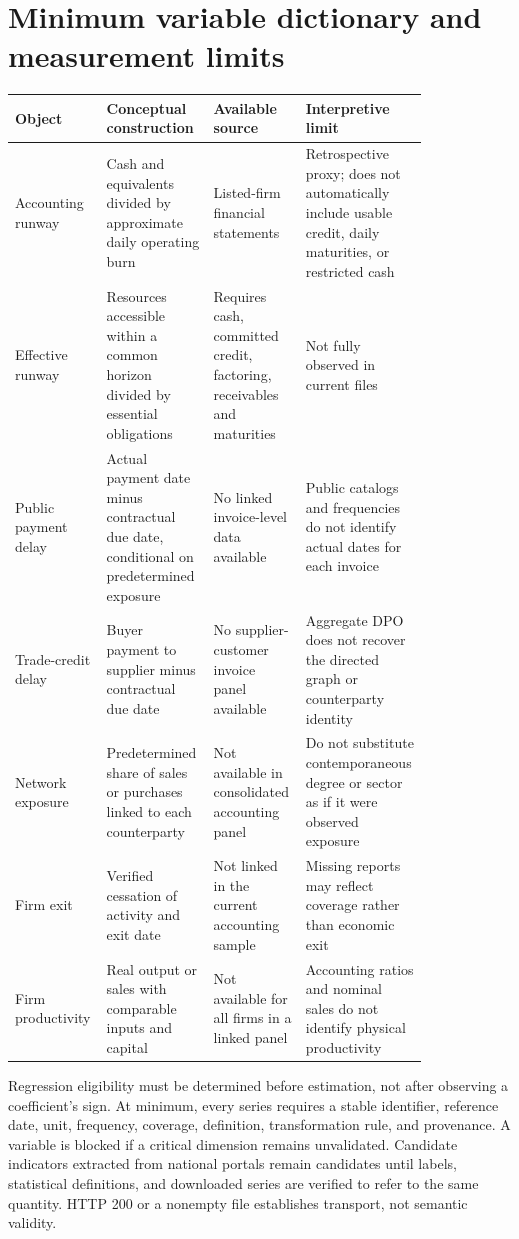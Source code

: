 \documentclass[11pt,a4paper]{article}
\begin{document}
\section{Minimum variable dictionary and measurement limits}
\begin{longtable}{>{\raggedright\arraybackslash}p{0.16\linewidth}>{\raggedright\arraybackslash}p{0.25\linewidth}>{\raggedright\arraybackslash}p{0.21\linewidth}>{\raggedright\arraybackslash}p{0.20\linewidth}}
\toprule
Object & Conceptual construction & Available source & Interpretive limit\\
\midrule
\endhead
Accounting runway & Cash and equivalents divided by approximate daily operating burn & Listed-firm financial statements & Retrospective proxy; does not automatically include usable credit, daily maturities, or restricted cash\\
Effective runway & Resources accessible within a common horizon divided by essential obligations & Requires cash, committed credit, factoring, receivables and maturities & Not fully observed in current files\\
Public payment delay & Actual payment date minus contractual due date, conditional on predetermined exposure & No linked invoice-level data available & Public catalogs and frequencies do not identify actual dates for each invoice\\
Trade-credit delay & Buyer payment to supplier minus contractual due date & No supplier-customer invoice panel available & Aggregate DPO does not recover the directed graph or counterparty identity\\
Network exposure & Predetermined share of sales or purchases linked to each counterparty & Not available in consolidated accounting panel & Do not substitute contemporaneous degree or sector as if it were observed exposure\\
Firm exit & Verified cessation of activity and exit date & Not linked in the current accounting sample & Missing reports may reflect coverage rather than economic exit\\
Firm productivity & Real output or sales with comparable inputs and capital & Not available for all firms in a linked panel & Accounting ratios and nominal sales do not identify physical productivity\\
\bottomrule\end{longtable}

Regression eligibility must be determined before estimation, not after observing a coefficient's sign. At minimum, every series requires a stable identifier, reference date, unit, frequency, coverage, definition, transformation rule, and provenance. A variable is blocked if a critical dimension remains unvalidated. Candidate indicators extracted from national portals remain candidates until labels, statistical definitions, and downloaded series are verified to refer to the same quantity. HTTP 200 or a nonempty file establishes transport, not semantic validity.
\end{document}

